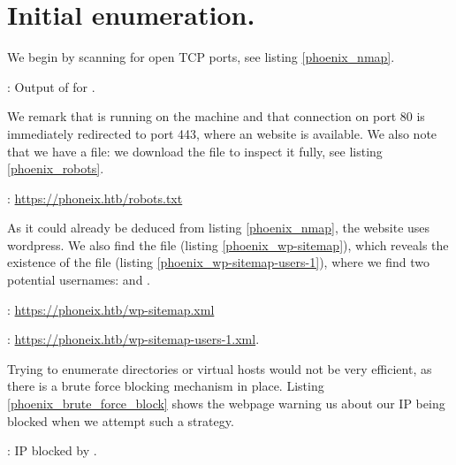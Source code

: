 \section{Initial enumeration.}
\par We begin by scanning  for open TCP ports, see listing \ref{phoenix_nmap}.
\begin{listing}
  \tiny
  
  \caption{: Output of  for .}
  \label{phoenix_nmap}
\end{listing}
\par We remark that  is running on the machine and that connection on port 80 is immediately redirected to port 443, where an  website is available. We also note that we have a  file: we download the file to inspect it fully, see listing \ref{phoenix_robots}.
\begin{listing}
  
  \caption{: \url{https://phoneix.htb/robots.txt}}
  \label{phoenix_robots}
\end{listing}
\par As it could already be deduced from listing \ref{phoenix_nmap}, the website uses wordpress. We also find the file  (listing \ref{phoenix_wp-sitemap}), which reveals the existence of the file  (listing \ref{phoenix_wp-sitemap-users-1}), where we find two potential usernames:  and .
\begin{listing}
  \small
  \caption{: \url{https://phoneix.htb/wp-sitemap.xml}}
  \label{phoenix_wp-sitemap}
\end{listing}
\begin{listing}
  \caption{: \url{https://phoneix.htb/wp-sitemap-users-1.xml}.}
  \label{phoenix_wp-sitemap-users-1}
\end{listing}
\par Trying to enumerate directories or virtual hosts would not be very efficient, as there is a brute force blocking mechanism in place. Listing \ref{phoenix_brute_force_block} shows the webpage warning us about our IP being blocked when we attempt such a strategy.
\begin{listing}
  \tiny
  \caption{: IP blocked by .}
  \label{phoenix_brute_force_block}
\end{listing}
